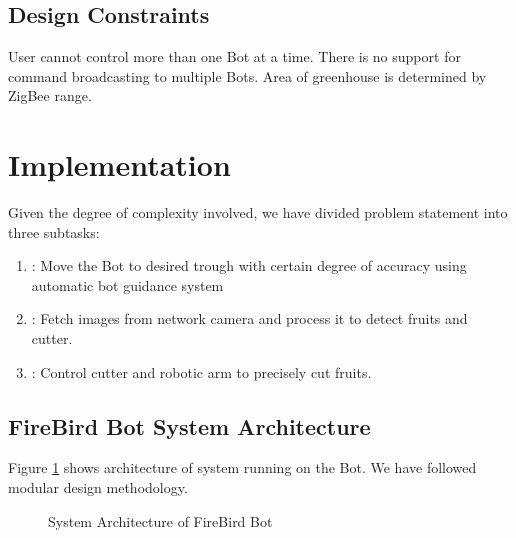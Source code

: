 \documentclass[a4paper, 12pt]{article}
\begin{document}
\subsection{Design Constraints}
User cannot control more than one Bot at a time. There is no support for command broadcasting to multiple Bots.
Area of greenhouse is determined by ZigBee range.

\section{Implementation}
Given the degree of complexity involved, we have divided problem statement into three subtasks:
\begin{enumerate}
 \item[Task \#1]: Move the Bot to desired trough with certain degree of accuracy using automatic bot guidance system 
 \item[Task \#2]: Fetch images from network camera and process it to detect fruits and cutter.
 \item[Task \#3]: Control cutter and robotic arm to precisely cut fruits.
\end{enumerate}

\subsection{FireBird Bot System Architecture}
Figure \ref{fig-arch} shows architecture of system running on the Bot. We have followed modular design methodology.
\begin{figure}
 
 \caption{System Architecture of FireBird Bot}
 \label{fig-arch}
\end{figure}
\end{document}
